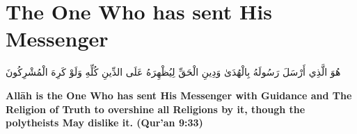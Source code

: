 \chapter{The One Who has sent His Messenger}
\begin{center}
    {\Huge    
        \begin{Arabic}
            هُوَ الَّذِي أَرْسَلَ رَسُولَهُ بِالْهُدَىٰ وَدِينِ الْحَقِّ لِيُظْهِرَهُ عَلَى الدِّينِ كُلِّهِ وَلَوْ كَرِهَ الْمُشْرِكُونَ
        \end{Arabic}
    }    
\end{center}
\vspace*{\fill}
\vspace{3cm}
\begin{center}
    \large \textbf{Allāh is the One Who has sent His Messenger with Guidance and The Religion of Truth to overshine all Religions by it, though the polytheists May dislike it. (Qur'an 9:33)}
\end{center}
